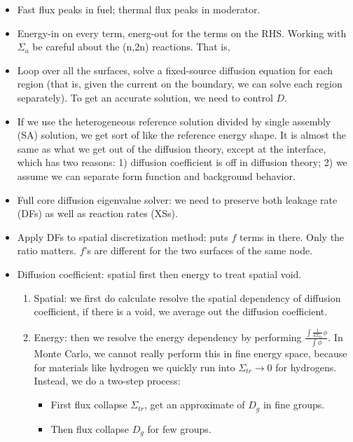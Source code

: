 \documentclass{school-22.211-notes}
\begin{document}
\clearpage
{}
\begin{itemize}
\item Fast flux peaks in fuel; thermal flux peaks in moderator. 
\item Energy-in on every term, energ-out for the terms on the RHS. Working with $\Sigma_a$ be careful about the (n,2n) reactions. That is, 
\item Loop over all the surfaces, solve a fixed-source diffusion equation for each region (that is, given the current on the boundary, we can solve each region separately). To get an accurate solution, we need to control $D$. 
\item If we use the heterogeneous reference solution divided by single assembly (SA) solution, we get sort of like the reference energy shape. It is almost the same as what we get out of the diffusion theory, except at the interface, which has two reasons: 1) diffusion coefficient is off in diffusion theory; 2) we assume we can separate form function and background behavior. 
\item Full core diffusion eigenvalue solver: we need to preserve both leakage rate (DFs) as well as reaction rates (XSs). 
\item Apply DFs to spatial discretization method: puts $f$ terms in there. Only the ratio matters. $f$'s are different for the two surfaces of the same node. 
\item Diffusion coefficient: spatial first then energy to treat spatial void. 
  \begin{enumerate}
    \item Spatial: we first do calculate resolve the spatial dependency of diffusion coefficient, if there is a void, we average out the diffusion coefficient.
    \item Energy: then we resolve the energy dependency by performing $\displaystyle \frac{\int \frac{1}{3\Sigma_{tr}} \phi}{\int \phi}$. In Monte Carlo, we cannot really perform this in fine energy space, because for materials like hydrogen we quickly run into $\Sigma_{tr} \to 0$ for hydrogens. Instead, we do a two-step process: 
      \begin{itemize}
        \item First flux collapse $\Sigma_{tr}$, get an approximate of $D_g$ in fine groups. 
        \item Then flux collapse $D_g$ for few groups.
      \end{itemize}
  \end{enumerate}


\end{itemize}
\end{document}
